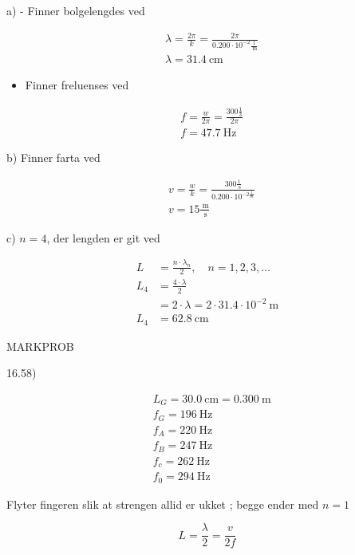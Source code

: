 \documentclass[10pt]{article}
\begin{document}
a) - Finner bolgelengdes ved

$$
\begin{aligned}
& \lambda=\frac{2 \pi}{k}=\frac{2 \pi}{0.200 \cdot 10^{-2} \frac{1}{\mathrm{~m}}} \\
& \lambda=31.4 \mathrm{~cm}
\end{aligned}
$$

\begin{itemize}
  \item Finner freluenses ved
\end{itemize}

$$
\begin{aligned}
& f=\frac{w}{2 \pi}=\frac{300 \frac{1}{3}}{2 \pi} \\
& f=47.7 \mathrm{~Hz}
\end{aligned}
$$

b) Finner farta ved

$$
\begin{aligned}
& v=\frac{w}{k}=\frac{300 \frac{1}{\mathrm{~s}}}{0.200 \cdot 10^{-2 \frac{1}{m}}} \\
& v=15 \frac{\mathrm{~m}}{\mathrm{~s}}
\end{aligned}
$$

c) $n=4$, der lengden er git ved

$$
\begin{aligned}
L & =\frac{n \cdot \lambda_{n}}{2}, \quad n=1,2,3, \ldots \\
L_{4} & =\frac{4 \cdot \lambda}{2} \\
& =2 \cdot \lambda=2 \cdot 31.4 \cdot 10^{-2} \mathrm{~m} \\
L_{4} & =62.8 \mathrm{~cm}
\end{aligned}
$$

MARKPROB

16.58)

$$
\begin{aligned}
& L_{G}=30.0 \mathrm{~cm}=0.300 \mathrm{~m} \\
& f_{G}=196 \mathrm{~Hz} \\
& f_{A}=220 \mathrm{~Hz} \\
& f_{B}=247 \mathrm{~Hz} \\
& f_{c}=262 \mathrm{~Hz} \\
& f_{0}=294 \mathrm{~Hz}
\end{aligned}
$$

Flyter fingeren slik at strengen allid er ukket ; begge ender med $n=1$

$$
L=\frac{\lambda}{2}=\frac{v}{2 f}
$$
\end{document}
